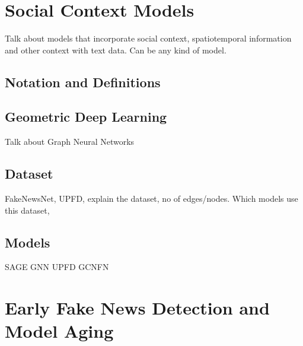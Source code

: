 \section{Social Context Models}
\label{sec:socialContextModels}
Talk about models that incorporate social context, spatiotemporal information and other context with text data. Can be any kind of model.

\subsection{Notation and Definitions}

\subsection{Geometric Deep Learning}
Talk about Graph Neural Networks

\subsection{Dataset}
FakeNewsNet, UPFD, explain the dataset, no of edges/nodes. Which models use this dataset,

\subsection{Models}
SAGE GNN
UPFD GCNFN

\section{Early Fake News Detection and Model Aging}